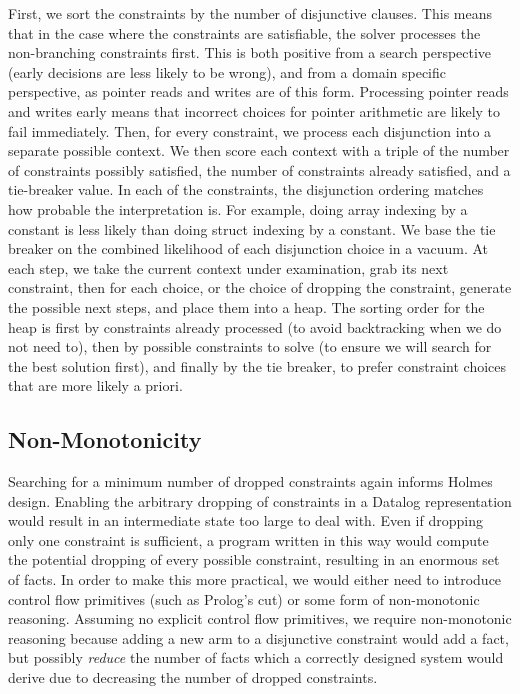 First, we sort the constraints by the number of disjunctive clauses. This means that in the case where the constraints are satisfiable, the solver processes the non-branching constraints first. This is both positive from a search perspective (early decisions are less likely to be wrong), and from a domain specific perspective, as pointer reads and writes are of this form. Processing pointer reads and writes early means that incorrect choices for pointer arithmetic are likely to fail immediately.
Then, for every constraint, we process each disjunction into a separate possible context. We then score each context with a triple of the number of constraints possibly satisfied, the number of constraints already satisfied, and a tie-breaker value.
In each of the constraints, the disjunction ordering matches how probable the interpretation is. For example, doing array indexing by a constant is less likely than doing struct indexing by a constant.
We base the tie breaker on the combined likelihood of each disjunction choice in a vacuum.
At each step, we take the current context under examination, grab its next constraint, then for each choice, or the choice of dropping the constraint, generate the possible next steps, and place them into a heap. The sorting order for the heap is first by constraints already processed (to avoid backtracking when we do not need to), then by possible constraints to solve (to ensure we will search for the best solution first), and finally by the tie breaker, to prefer constraint choices that are more likely a priori.

\subsection{Non-Monotonicity}
\label{bitr:sec:circ}
Searching for a minimum number of dropped constraints again informs Holmes design.
Enabling the arbitrary dropping of constraints in a Datalog representation would result in an intermediate state too large to deal with.
Even if dropping only one constraint is sufficient, a program written in this way would compute the potential dropping of every possible constraint, resulting in an enormous set of facts.
In order to make this more practical, we would either need to introduce control flow primitives (such as Prolog's cut) or some form of non-monotonic reasoning.
Assuming no explicit control flow primitives, we require non-monotonic reasoning because adding a new arm to a disjunctive constraint would add a fact, but possibly \emph{reduce} the number of facts which a correctly designed system would derive due to decreasing the number of dropped constraints.

